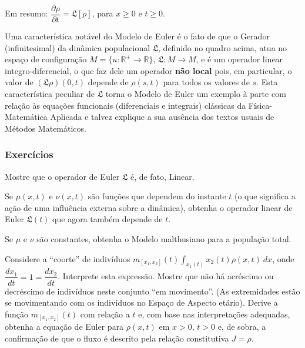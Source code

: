 Em resumo: \(\dfrac{\partial \rho}{\partial t} = \mathfrak{L}[\rho]\), para \(x \ge 0\) e \(t \ge 0\).

Uma característica notável do Modelo de Euler é o fato de que o Gerador (infinitesimal) da dinâmica populacional \(\mathfrak{L}\), definido no quadro acima, atua no espaço de configuração \(M = \{u: \mathbb{R}^+ \to \mathbb{R}\}\), \(\mathfrak{L}: M \to M\), e é um operador linear integro-diferencial, o que faz dele um operador \textbf{não local} pois, em particular, o valor de \((\mathfrak{L}\rho)(0,t)\) depende de \(\rho(s,t)\) para todos os valores de \(s\). Esta característica peculiar de \(\mathfrak{L}\) torna o Modelo de Euler um exemplo à parte com relação às equações funcionais (diferenciais e integrais) clássicas da Física-Matemática Aplicada e talvez explique a sua ausência dos textos usuais de Métodos Matemáticos.

{\small\color{blue}
\subsubsection*{Exercícios}

\begin{exercise}
Mostre que o operador de Euler \(\mathfrak{L}\) é, de fato, Linear.
\end{exercise}

\begin{exercise}
Se \(\mu(x,t)\) e \(\nu(x,t)\) são funções que dependem do instante \(t\) (o que significa a ação de uma influência externa sobre a dinâmica), obtenha o operador linear de Euler \(\mathfrak{L}(t)\) que agora também depende de \(t\).
\end{exercise}

\begin{exercise}
Se \(\mu\) e \(\nu\) são constantes, obtenha o Modelo malthusiano para a população total.
\end{exercise}

\begin{exercise}
Considere a ``coorte'' de indivíduos \(m_{[x_1,x_2]}(t) \displaystyle\int_{x_1(t)}{x_2(t)} \rho(x,t)\ dx\), onde
\(\dfrac{dx_1}{dt} = 1 = \dfrac{dx_2}{dt}\). Interprete esta expressão. Mostre que não há acréscimo ou decréscimo de indivíduos neste conjunto ``em movimento''. (As extremidades estão se movimentando com os indivíduos no Espaço de Aspecto etário). Derive a função \(m_{[x_1,x_2]}(t)\) com relação a \(t\) e, com base nas interpretações adequadas, obtenha a equação de Euler para \(\rho(x,t)\) em \(x > 0\), \(t > 0\) e, de sobra, a confirmação de que o fluxo é descrito pela relação constitutiva \(J = \rho\).
\end{exercise}
}




